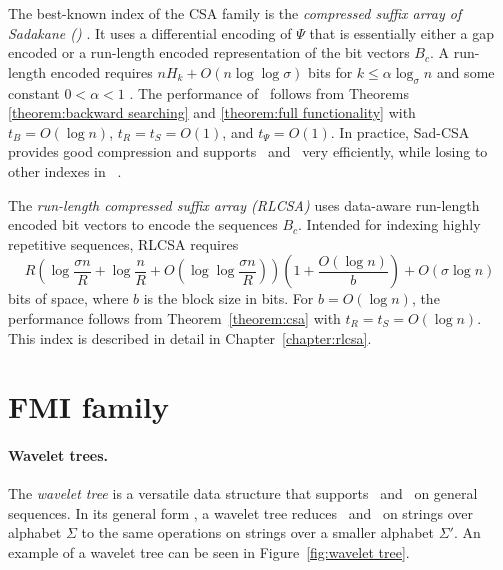 The best-known index of the CSA family is the \emph{compressed suffix array of Sadakane (\sadcsa)} \cite{Sadakane2003,Sadakane2002}. It uses a differential encoding of $\Psi$ that is essentially either a gap encoded or a run-length encoded representation of the bit vectors $B_{c}$. A run-length encoded \sadcsa{} requires $nH_{k} + O(n \log \log \sigma)$ bits for $k \le \alpha \log_{\sigma} n$ and some constant $0 < \alpha < 1$ \cite{Navarro2007}. The performance of \sadcsa\ follows from Theorems \ref{theorem:backward searching} and \ref{theorem:full functionality} with $t_{B} = O(\log n)$, $t_{R} = t_{S} = O(1)$, and $t_{\Psi} = O(1)$. In practice, Sad-CSA provides good compression and supports \locate\ and \extract\ very efficiently, while losing to other indexes in \find\ \cite{Ferragina2009a}.

The \emph{run-length compressed suffix array (RLCSA)} \cite{Maekinen2010,Siren2009} uses data-aware run-length encoded bit vectors to encode the sequences $B_{c}$. Intended for indexing highly repetitive sequences, RLCSA requires
$$
R
\left( \log \frac{\sigma n}{R} + \log \frac{n}{R} + O\left( \log\log \frac{\sigma n}{R} \right) \right)
\left( 1 + \frac{O(\log n)}{b} \right) +
O(\sigma \log n)
$$
bits of space, where $b$ is the block size in bits. For $b = O(\log n)$, the performance follows from Theorem~\ref{theorem:csa} with $t_{R} = t_{S} = O(\log n)$. This index is described in detail in Chapter~\ref{chapter:rlcsa}.


\section{FMI family}\label{sect:wavelet trees}

\paragraph{Wavelet trees.}

The \emph{wavelet tree} \cite{Grossi2003} is a versatile data structure that supports \rank\ and \select\ on general sequences. In its general form \cite{Ferragina2007a}, a wavelet tree reduces \rank\ and \select\ on strings over alphabet $\Sigma$ to the same operations on strings over a smaller alphabet $\Sigma'$. An example of a wavelet tree can be seen in Figure~\ref{fig:wavelet tree}.

